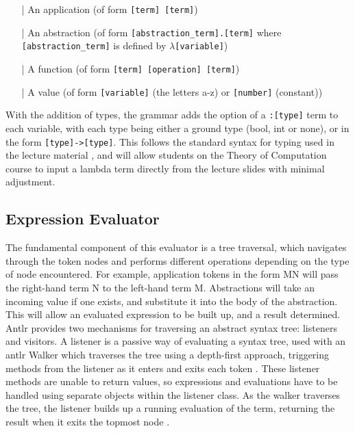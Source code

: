 \documentclass[a4paper,12pt]{report}
\begin{document}
\begin{itemize}
\item[|] An application (of form \texttt{[term] [term]})
\item[|] An abstraction (of form \texttt{[abstraction_term].[term]} where \texttt{[abstraction_term]} is defined by \texttt{$\lambda$[variable]})
\item[|] A function (of form \texttt{[term] [operation] [term]})
\item[|] A value (of form \texttt{[variable]} (the letters a-z) or \texttt{[number]} (constant))
\end{itemize}

With the addition of types, the grammar adds the option of a \texttt{:[type]} term to each variable, with each type being either a ground type (bool, int or none), or in the form \texttt{[type]->[type]}. This follows the standard syntax for typing used in the lecture material \cite{Hankin2004} \cite{Gay2019}, and will allow students on the Theory of Computation course to input a lambda term directly from the lecture slides with minimal adjustment.

\subsection{Expression Evaluator}

The fundamental component of this evaluator is a tree traversal, which navigates through the token nodes and performs different operations depending on the type of node encountered. For example, application tokens in the form MN will pass the right-hand term N to the left-hand term M. Abstractions will take an incoming value if one exists, and substitute it into the body of the abstraction. This will allow an evaluated expression to be built up, and a result determined.\\

Antlr provides two mechanisms for traversing an abstract syntax tree: listeners and visitors. A listener is a passive way of evaluating a syntax tree, used with an antlr Walker which traverses the tree using a depth-first approach, triggering methods from the listener as it enters and exits each token \cite{Parr2012}. These listener methods are unable to return values, so expressions and evaluations have to be handled using separate objects within the listener class. As the walker traverses the tree, the listener builds up a running evaluation of the term, returning the result when it exits the topmost node \cite{Srivastav2017}.\\
\end{document}
